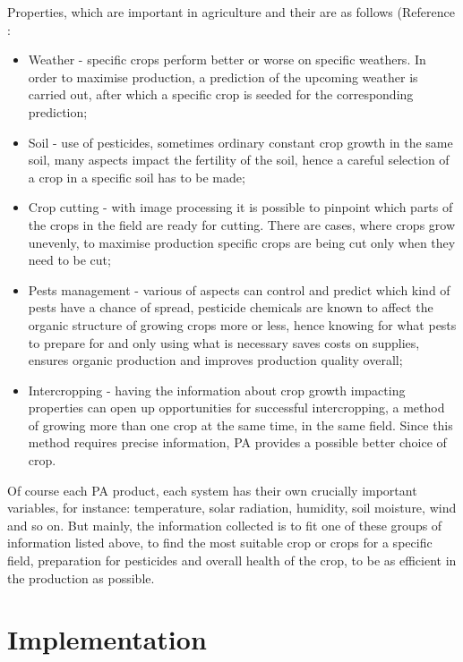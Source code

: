\documentclass[11pt,a5paper,footinclude=true,headinclude=true, oneside]{scrbook}
\begin{document}
Properties, which are important in agriculture and their are as follows (Reference \cite{lokhande_effective_2021}: 
\begin{itemize}
    \item Weather - specific crops perform better or worse on specific weathers. In order to maximise production, a prediction of the upcoming weather is carried out, after which a specific crop is seeded for the corresponding prediction;
    \item Soil - use of pesticides, sometimes ordinary constant crop growth in the same soil, many aspects impact the fertility of the soil, hence a careful selection of a crop in a specific soil has to be made;
    \item Crop cutting - with image processing it is possible to pinpoint which parts of the crops in the field are ready for cutting. There are cases, where crops grow unevenly, to maximise production specific crops are being cut only when they need to be cut;
    \item Pests management - various of aspects can control and predict which kind of pests have a chance of spread, pesticide chemicals are known to affect the organic structure of growing crops more or less, hence knowing for what pests to prepare for and only using what is necessary saves costs on supplies, ensures organic production and improves production quality overall;
    \item Intercropping - having the information about crop growth impacting properties can open up opportunities for successful intercropping, a method of growing more than one crop at the same time, in the same field. Since this method requires precise information, PA provides a possible better choice of crop.
\end{itemize}
Of course each PA product, each system has their own crucially important variables, for instance: temperature, solar radiation, humidity, soil moisture, wind and so on. But mainly, the  information collected is to fit one of these groups of information listed above, to find the most suitable crop or crops for a specific field, preparation for pesticides and overall health of the crop, to be as efficient in the production as possible. 
    
\section{Implementation}
\end{document}
